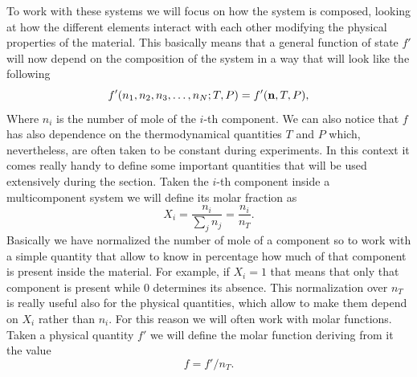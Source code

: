 To work with these systems we will focus on how the system is composed, looking at how the different elements interact with each other modifying the physical properties of the material. This basically means that a general function of state $f'$ will now depend on the composition of the system in a way that will look like the following
\begin{equation}
    f'(n_1, n_2, n_3, \dots, n_N; T, P) = f'(\vb{n}, T, P),
\end{equation}
Where $n_i$ is the number of mole of the $i$-th component. We can also notice that $f$ has also dependence on the thermodynamical quantities $T$ and $P$ which, nevertheless, are often taken to be constant during experiments. In this context it comes really handy to define some important quantities that will be used extensively during the section.
{
    Taken the $i$-th component inside a multicomponent system we will define its molar fraction as
    \begin{equation}
        \label{eq:MolarFraction}
        X_i = \frac{n_i}{\sum_j n_j} = \frac{n_i}{n_T}.
    \end{equation}
}
\noindent
Basically we have normalized the number of mole of a component so to work with a simple quantity that allow to know in percentage how much of that component is present inside the material. For example, if $X_i = 1$ that means that only that component is present while $0$ determines its absence. This normalization over $n_T$ is really useful also for the physical quantities, which allow to make them depend on $X_i$ rather than $n_i$. For this reason we will often work with molar functions.
{
    Taken a physical quantity $f'$ we will define the molar function deriving from it the value
    \begin{equation}
        \label{eq:MolarFunction}
        f = f'/n_T.
    \end{equation} 
}


